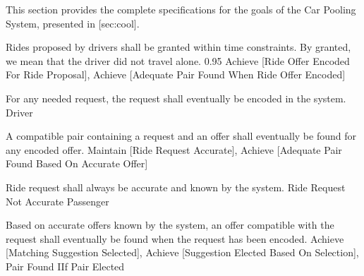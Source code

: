 
\startsubsection[title={Goal specifications}]

  This section provides the complete specifications for the goals of the Car
  Pooling System, presented in [sec:cool].


    {}

  \startkaosspec
  	 {Rides proposed by drivers shall be granted within time constraints. By granted, we mean that the driver did not travel alone.}
  	 {0.95}
  	 {Achieve [Ride Offer Encoded For Ride Proposal], Achieve [Adequate Pair Found When Ride Offer Encoded]}
  \stopkaosspec

  \startkaosspec
  	 {For any needed request, the request shall eventually be encoded in the system.}
  	 {Driver}
  \stopkaosspec

  \startkaosspec
  	 {A compatible pair containing a request and an offer shall eventually be found for any encoded offer.}
  	 {Maintain [Ride Request Accurate], Achieve [Adequate Pair Found Based On Accurate Offer]}
  \stopkaosspec

  \startkaosspec
  	 {Ride request shall always be accurate and known by the system.}
  	 {Ride Request Not Accurate}
  	 {Passenger}
  \stopkaosspec
  
  \startkaosspec
  	 {Based on accurate offers known by the system, an offer compatible with the request shall eventually be found when the request has been encoded.}
  	 {Achieve [Matching Suggestion Selected], Achieve [Suggestion Elected Based On Selection], Pair Found IIf Pair Elected}
  \stopkaosspec


